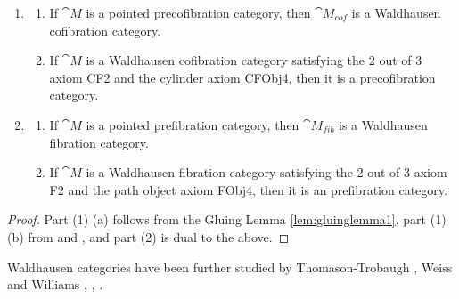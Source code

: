 \begin{prop}
\label{prop:relcatcofcatwaldhausen}
\mbox{}
\begin{enumerate}
\item
\begin{enumerate}
\item
If ${\cat M}$ is a pointed precofibration category, then ${\cat M}_{cof}$ is a Waldhausen cofibration category.
\item
If ${\cat M}$ is a Waldhausen cofibration category satisfying the 2 out of 3 axiom CF2 and the cylinder axiom CFObj4, then it is a precofibration category.
\end{enumerate}
\item
\begin{enumerate}
\item
If ${\cat M}$ is a pointed prefibration category, then ${\cat M}_{fib}$ is a Waldhausen fibration category.
\item
If ${\cat M}$ is a Waldhausen fibration category satisfying the 2 out of 3 axiom F2 and the path object axiom FObj4, then it is an prefibration category.
\end{enumerate}
\end{enumerate}
\end{prop}

\begin{proof}
Part (1) (a) follows from the Gluing Lemma \ref{lem:gluinglemma1}, part (1) (b) from  and , and part (2) is dual to the above.
\end{proof}

Waldhausen categories have been further studied by Thomason-Trobaugh \cite{Thomason-Trobaugh}, Weiss and Williams \cite{Weiss1}, \cite{Weiss2}, \cite{Weiss3}.